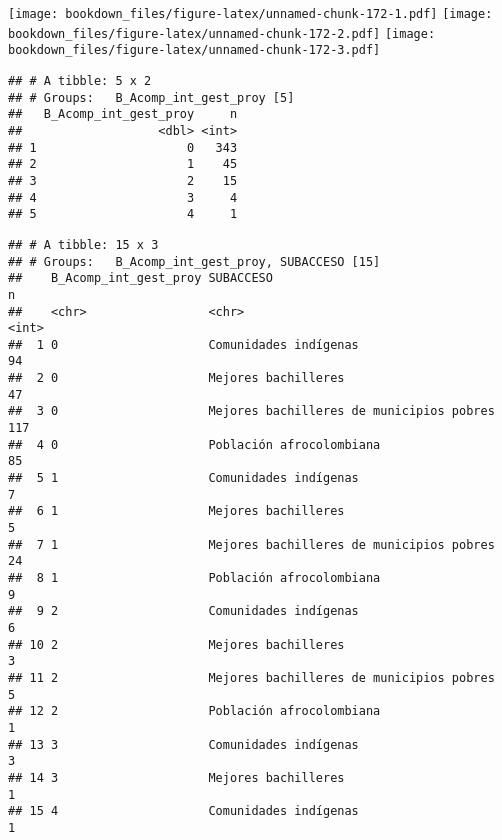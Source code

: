 \documentclass[]{article}
\theoremstyle{definition}
\theoremstyle{definition}
\theoremstyle{definition}
\theoremstyle{remark}
\begin{document}
\texttt{[image: bookdown\_files/figure-latex/unnamed-chunk-172-1.pdf]}
\texttt{[image: bookdown\_files/figure-latex/unnamed-chunk-172-2.pdf]}
\texttt{[image: bookdown\_files/figure-latex/unnamed-chunk-172-3.pdf]}

\begin{verbatim}
## # A tibble: 5 x 2
## # Groups:   B_Acomp_int_gest_proy [5]
##   B_Acomp_int_gest_proy     n
##                   <dbl> <int>
## 1                     0   343
## 2                     1    45
## 3                     2    15
## 4                     3     4
## 5                     4     1
\end{verbatim}

\begin{verbatim}
## # A tibble: 15 x 3
## # Groups:   B_Acomp_int_gest_proy, SUBACCESO [15]
##    B_Acomp_int_gest_proy SUBACCESO                                    n
##    <chr>                 <chr>                                    <int>
##  1 0                     Comunidades indígenas                       94
##  2 0                     Mejores bachilleres                         47
##  3 0                     Mejores bachilleres de municipios pobres   117
##  4 0                     Población afrocolombiana                    85
##  5 1                     Comunidades indígenas                        7
##  6 1                     Mejores bachilleres                          5
##  7 1                     Mejores bachilleres de municipios pobres    24
##  8 1                     Población afrocolombiana                     9
##  9 2                     Comunidades indígenas                        6
## 10 2                     Mejores bachilleres                          3
## 11 2                     Mejores bachilleres de municipios pobres     5
## 12 2                     Población afrocolombiana                     1
## 13 3                     Comunidades indígenas                        3
## 14 3                     Mejores bachilleres                          1
## 15 4                     Comunidades indígenas                        1
\end{verbatim}
\end{document}
